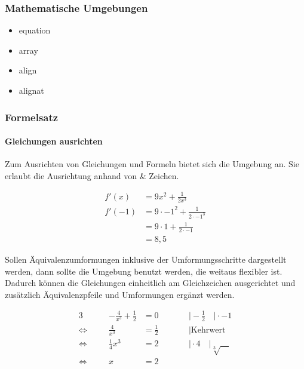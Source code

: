 \subsubsection*{Mathematische Umgebungen}
\begin{itemize}
	\item equation
	\item array
	\item align
	\item alignat
\end{itemize}

\subsubsection*{Formelsatz}

\paragraph{Gleichungen ausrichten}

Zum Ausrichten von Gleichungen und Formeln bietet sich die \sarg Umgebung an. Sie erlaubt die Ausrichtung anhand von \& Zeichen.
\begin{example}
	\begin{align*}
	f'(x) &= 9x^2 + \frac{1}{2x^3} \\
	f'(-1) &= 9\cdot -1^2 + \frac{1}{2\cdot -1^3} \\
		&= 9\cdot 1 + \frac{1}{2\cdot -1} \\
		&= 8,5
	\end{align*}
\end{example}


Sollen Äquivalenzumformungen inklusive der Umformungsschritte dargestellt werden, dann sollte die Umgebung \sarg benutzt werden, die weitaus flexibler ist. Dadurch können die Gleichungen einheitlich am Gleichzeichen ausgerichtet und zusätzlich Äquivalenzpfeile und Umformungen ergänzt werden.
\begin{example}
	\begin{alignat*}{3}
	&& -\frac{4}{x^3} + \frac{1}{2} &= 0 &&\qquad\rvert-\frac{1}{2}\quad\rvert\cdot -1 \\
	\Leftrightarrow\quad && \frac{4}{x^3} &= \frac{1}{2} &&\qquad\rvert\text{Kehrwert}\\
	\Leftrightarrow\quad && \frac{1}{4}x^3 &= 2 &&\qquad\rvert\cdot 4\quad|\sqrt[3]{\quad}\\
	\Leftrightarrow\quad && x &= 2 &&
	\end{alignat*}
\end{example}

